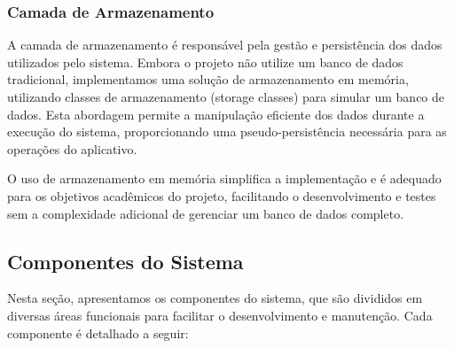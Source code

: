 \documentclass[../main.tex]{subfiles}
\begin{document}
\subsubsection{Camada de Armazenamento}
A camada de armazenamento é responsável pela gestão e persistência dos dados utilizados pelo sistema. Embora o projeto não utilize um banco de dados tradicional, implementamos uma solução de armazenamento em memória, utilizando classes de armazenamento (storage classes) para simular um banco de dados. Esta abordagem permite a manipulação eficiente dos dados durante a execução do sistema, proporcionando uma pseudo-persistência necessária para as operações do aplicativo.

O uso de armazenamento em memória simplifica a implementação e é adequado para os objetivos acadêmicos do projeto, facilitando o desenvolvimento e testes sem a complexidade adicional de gerenciar um banco de dados completo.


\subsection{Componentes do Sistema}

Nesta seção, apresentamos os componentes do sistema, que são divididos em diversas áreas funcionais para facilitar o desenvolvimento e manutenção. Cada componente é detalhado a seguir:
\end{document}
